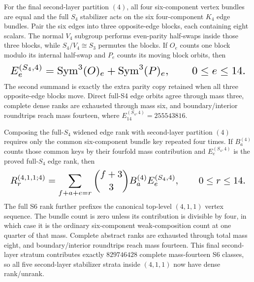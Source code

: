 \documentclass{article}
\newcommand{\fitmath}[1]{\resizebox{0.99\linewidth}{!}{$\displaystyle #1$}}
\begin{document}
For the final second-layer partition $(4)$, all four six-component vertex
bundles are equal and the full $S_4$ stabilizer acts on the six four-component
$K_4$ edge bundles. Pair the six edges into three opposite-edge blocks, each
containing eight scalars. The normal $V_4$ subgroup performs even-parity
half-swaps inside those three blocks, while $S_4/V_4\cong S_3$ permutes the
blocks. If $O_e$ counts one block modulo its internal half-swap and $P_e$ counts
its moving block orbits, then
\begin{equation}
  \fitmath{%
    E_e^{(S_4,4)}=\operatorname{Sym}^3(O)_e+
      \operatorname{Sym}^3(P)_e,
    \qquad 0\leq e\leq14.
  }
  \label{eq:optimization-crazy-sextuple-s6-s4-edge-core-ranking}
\end{equation}
The second summand is exactly the extra parity copy retained when all three
opposite-edge blocks move. Direct full-S4 edge orbits agree through mass three,
complete dense ranks are exhausted through mass six, and boundary/interior
roundtrips reach mass fourteen, where $E_{14}^{(S_4,4)}=255543816$.

Composing the full-$S_4$ widened edge rank with second-layer partition $(4)$
requires only the common six-component bundle key repeated four times. If
$B_a^{(4)}$ counts those common keys by their fourfold mass contribution and
$E_e^{(S_4,4)}$ is the proved full-$S_4$ edge rank, then
\begin{equation}
  \fitmath{%
    R_r^{(4,1,1;4)}=
      \sum_{f+a+e=r}{f+3\choose3}
      B_a^{(4)}E_e^{(S_4,4)},
    \qquad 0\leq r\leq14.
  }
  \label{eq:optimization-crazy-sextuple-s6-s4-full-bundle-ranking}
\end{equation}
The full S6 rank further prefixes the canonical top-level $(4,1,1)$ vertex
sequence. The bundle count is zero unless its contribution is divisible by
four, in which case it is the ordinary six-component weak-composition count at
one quarter of that mass. Complete abstract ranks are exhausted through total
mass eight, and boundary/interior roundtrips reach mass fourteen. This final
second-layer stratum contributes exactly $829746428$ complete mass-fourteen S6
classes, so all five second-layer stabilizer strata inside $(4,1,1)$ now have
dense rank/unrank.
\end{document}
